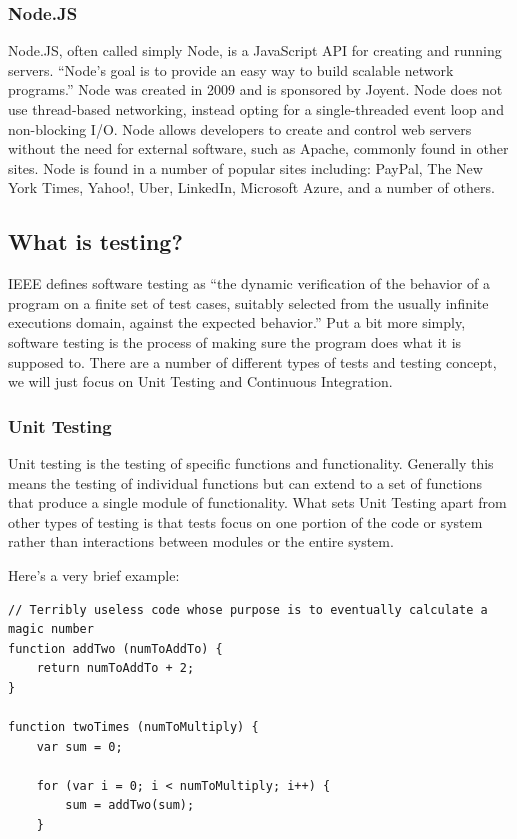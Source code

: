 \documentclass[11pt]{article}
\begin{document}
\begin{multicols}{2}
\subsubsection{Node.JS}
Node.JS, often called simply Node, is a JavaScript API for creating and running servers. ``Node's goal is to provide an easy way to build scalable network programs.'' \cite{Node} Node was created in 2009 and is sponsored by Joyent. Node does not use thread-based networking, instead opting for a single-threaded event loop and non-blocking I/O. Node allows developers to create and control web servers without the need for external software, such as Apache, commonly found in other sites.
Node is found in a number of popular sites including: PayPal, The New York Times, Yahoo!, Uber, LinkedIn, Microsoft Azure, and a number of others. \cite{Node}

\subsection{What is testing?}
IEEE defines software testing as ``the dynamic verification of the behavior of a program on a finite set of test cases, suitably selected from the usually infinite executions domain, against the expected behavior.'' \cite{TestingDefinition} Put a bit more simply, software testing is the process of making sure the program does what it is supposed to.
There are a number of different types of tests and testing concept, we will just focus on Unit Testing and Continuous Integration.

\subsubsection{Unit Testing}
Unit testing is the testing of specific functions and functionality. Generally this means the testing of individual functions but can extend to a set of functions that produce a single module of functionality. What sets Unit Testing apart from other types of testing is that tests focus on one portion of the code or system rather than interactions between modules or the entire system.

Here's a very brief example:
\begin{lstlisting}
// Terribly useless code whose purpose is to eventually calculate a magic number
function addTwo (numToAddTo) {
	return numToAddTo + 2;
}

function twoTimes (numToMultiply) {
	var sum = 0;

	for (var i = 0; i < numToMultiply; i++) {
		sum = addTwo(sum);
	}


\end{lstlisting}
\end{multicols}
\end{document}
